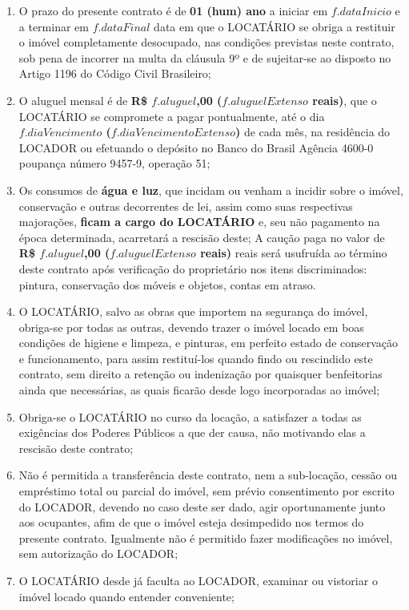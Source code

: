 \documentclass[a4paper,12pt]{article}
\begin{document}
\begin{enumerate}

\item O prazo do presente contrato é de \textbf{01 (hum) ano} a iniciar em ${f.dataInicio}$
e a terminar em ${f.dataFinal}$ data em que o LOCATÁRIO
se obriga a restituir o imóvel completamente desocupado, nas condições previstas neste contrato,
sob pena de incorrer na multa da cláusula 9º e de sujeitar-se ao disposto no Artigo 1196 do Código Civil Brasileiro;
\item O aluguel mensal é de \textbf{R\$ ${f.aluguel}$,00 (${f.aluguelExtenso}$  reais)},
que o LOCATÁRIO se compromete a pagar pontualmente, até o dia \textbf{${f.diaVencimento}$  (${f.diaVencimentoExtenso}$)}
de cada mês, na residência do LOCADOR ou efetuando o depósito no Banco do Brasil Agência 4600-0 poupança número 9457-9, operação 51;
\item Os consumos de \textbf{água e luz}, que incidam ou venham a incidir sobre o imóvel, conservação e outras decorrentes de lei, assim como suas respectivas majorações, \textbf{ficam a cargo do LOCATÁRIO} e, seu não pagamento na época determinada, acarretará a rescisão deste; A caução paga no valor de \textbf{R\$ ${f.aluguel}$,00 (${f.aluguelExtenso}$  reais)} reais será usufruída ao término deste contrato após verificação do proprietário nos itens discriminados: pintura, conservação dos móveis e objetos, contas em atraso.
\item O LOCATÁRIO, salvo as obras que importem na segurança do imóvel, obriga-se por todas as outras, devendo trazer o imóvel locado em boas condições de higiene e limpeza, e pinturas, em perfeito estado de conservação e funcionamento, para assim restituí-los quando findo ou rescindido este contrato, sem direito a retenção ou indenização por quaisquer benfeitorias ainda que necessárias, as quais ficarão desde logo incorporadas ao imóvel;
\item Obriga-se o LOCATÁRIO no curso da locação, a satisfazer a todas as exigências dos Poderes Públicos a que der causa, não motivando elas a rescisão deste contrato;
\item Não é permitida a transferência deste contrato, nem a sub-locação, cessão ou empréstimo total ou parcial do imóvel, sem prévio consentimento por escrito do LOCADOR, devendo no caso deste ser dado, agir oportunamente junto aos ocupantes, afim de que o imóvel esteja desimpedido nos termos do presente contrato. Igualmente não é permitido fazer modificações no imóvel, sem autorização do LOCADOR;
\item O LOCATÁRIO desde já faculta ao LOCADOR, examinar ou vistoriar o imóvel locado quando entender conveniente;

\end{enumerate}
\end{document}
